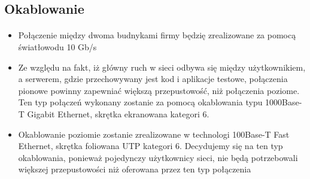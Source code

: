 \subsection{Okablowanie}
\paragraph{}


\begin{itemize}
  \item Połączenie między dwoma budnykami firmy będzię zrealizowane za pomocą światłowodu 10 Gb/s

  \item Ze względu na fakt, iż główny ruch w sieci odbywa się między użytkownikiem, a serwerem, gdzie przechowywany jest kod i aplikacje testowe, połączenia pionowe powinny zapewniać większą przepustowość, niż połączenia  poziome. Ten typ połączeń wykonany zostanie za pomocą okablowania typu 1000Base-T Gigabit Ethernet, skrętka ekranowana kategori 6.

  \item Okablowanie poziomie zostanie zrealizowane w technologi 100Base-T Fast Ethernet, skrętka foliowana UTP kategori 6. Decydujemy się na ten typ okablowania, ponieważ pojedynczy użytkownicy sieci, nie będą potrzebowali większej przepustowości niż oferowana przez ten typ połączenia

\end{itemize}